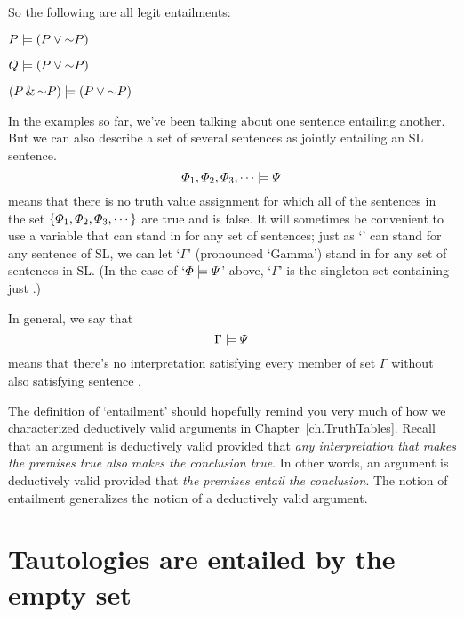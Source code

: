 {{So the following are all legit entailments:

\begin{earg}
\item[] $P \models (P \eor \enot P)$
\item[] $Q \models (P \eor \enot P)$
\item[] $(P \eand \enot P) \models (P \eor \enot P)$
\end{earg}


In the examples so far, we've been talking about one sentence entailing another. But we can also describe a set of several sentences as jointly entailing an SL sentence. $$\varPhi{}_1,\varPhi{}_2,\varPhi{}_3,\cdots\models\varPsi{}$$ means that there is no truth value assignment for which all of the sentences in the set $\{\varPhi{}_1,\varPhi{}_2,\varPhi{}_3,\cdots\}$ are true and \metaB{} is false. It will sometimes be convenient to use a variable that can stand in for any set of sentences; just as `\metaA{}' can stand for any sentence of SL, we can let `$\Gamma$' (pronounced `Gamma') stand in for any set of sentences in SL. (In the case of `$\varPhi{}\models\varPsi{}$' above, `$\Gamma$' is the singleton set containing just \metaA{}.)

In general, we say that $$\Gamma\models\varPsi{}$$ means that there's no interpretation satisfying every member of set $\Gamma$ without also satisfying sentence \metaB{}.

{\color{black}The definition of `entailment' should hopefully remind you very much of how we characterized deductively valid arguments in Chapter~\ref{ch.TruthTables}. Recall that an argument is deductively valid provided that \textit{any interpretation that makes the premises true also makes the conclusion true}. In other words, an argument is deductively valid provided that \textit{the premises entail the conclusion}. The notion of entailment generalizes the notion of a deductively valid argument.}




\section{Tautologies are entailed by the empty set}

}}
